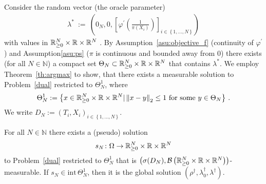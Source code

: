 Consider 
the random vector (the oracle parameter)
\begin{align*}
  \lambda^*
  \ 
  :=
  \ 
  \left(
  0_{N},0,
  \left[
  \varphi^{'}
  \left(
  \frac
  {1}
  {\pi(X_i)}
  \right)
\right]_{i\in \left\{
  1,\ldots,N
\right\}}
  \right)
\end{align*}
with values in 
$\mathbb{R}^N_{\ge 0}\times \mathbb{R}\times \mathbb{R}^N$
.
By Assumption~\ref{asu:objective_f} (continuity of $\varphi^{'}$)
and Assumption\ref{asu:ps} ($\pi$ is continuous and bounded away from 0)
there exists (for all $N\in\mathbb{N}$) a compact set 
$
\Theta_N\subset
\mathbb{R}^N_{\ge 0}\times \mathbb{R}\times \mathbb{R}^N
$
that contains $\lambda^*$. 
We employ Theorem~\ref{th:argmax} to show, that there exists a measurable solution to Problem~\ref{dual} restricted to $\Theta_N^1$,
where 
\begin{align*}
  \Theta_N^1
  :=
  \left\{
    x\in 
\R^N_{\ge 0}\times \R\times \R^N
|
\norm{x-y}_2\le 1
\ 
\text{for some}\ 
y\in\Theta_N
  \right\}
  \,.
\end{align*}
We write $D_N:=(T_i,X_i)_{i\in \left\{
  1,\ldots,N
\right\}}$.
\begin{lemma}
  \label{lem:pseud_sol}
  For all $N\in\mathbb{N}$ there exists a (pseudo) solution
  \begin{align*}
    s_N\colon
    \Omega
    \to
  \mathbb{R}^N_{\ge 0}
  \times
  \mathbb{R}
  \times
  \mathbb{R}^{N}
  \end{align*}
  to
  Problem~\ref{dual} restricted to $\Theta_N^1$ 
  that is
$
  \left(
    \sigma(D_N),\mathcal{B}
  \left(
  \mathbb{R}^N_{\ge 0}
  \times
  \mathbb{R}
  \times
  \mathbb{R}^{N}
  \right)
  \right)
$-measurable.
If $s_N\in \mathrm{int}\, \Theta_N^1$, then it is the global solution
  $
  (\rho^\dagger,\lambda_0^\dagger,\lambda^\dagger)
  $.
\end{lemma}

